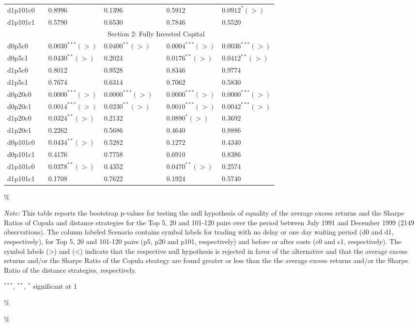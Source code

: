 \documentclass[a4paper]{article}
\begin{document}
\begin{threeparttable}[H]
\begin{tabularx}{\textwidth}{@{\extracolsep{\fill}}lllllll@{}}
			d1p101c0 & & 0.8996 & 0.1396 &       & 0.5912 & $0.0912^{*}(>)$ \\
			d1p101c1 & & 0.5790 & 0.6530 &       & 0.7846 & 0.5520 \\
			\midrule
			& \multicolumn{6}{c}{Section 2:  Fully Invested Capital } \\
			\midrule
			d0p5c0 & & $0.0030^{***}(>)$ & $0.0400^{**}(>)$ &       & $0.0004^{***}(>)$ & $0.0036^{***}(>)$ \\
			d0p5c1 & & $0.0430^{**}(>)$ & 0.2024 &       & $0.0176^{**}(>)$ & $0.0412^{**}(>)$ \\
			d1p5c0 & & 0.8012 & 0.9528 &       & 0.8346 & 0.9774 \\
			d1p5c1 & & 0.7674 & 0.6314 &       & 0.7062 & 0.5830 \\
			d0p20c0 & & $0.0000^{***}(>)$ & $0.0000^{***}(>)$ &       & $0.0000^{***}(>)$ & $0.0000^{***}(>)$ \\
			d0p20c1 & & $0.0014^{***}(>)$ & $0.0230^{**}(>)$ &       & $0.0010^{***}(>)$ & $0.0042^{***}(>)$ \\
			d1p20c0 & & $0.0324^{**}(>)$ & 0.2132 &       & $0.0890^{*}(>)$ & 0.3692 \\
			d1p20c1 & & 0.2262 & 0.5686 &       & 0.4640 & 0.8886 \\
			d0p101c0 & & $0.0434^{**}(>)$ & 0.5282 &       & 0.1272 & 0.4340 \\
			d0p101c1 & & 0.4176 & 0.7758 &       & 0.6910 & 0.8386 \\
			d1p101c0 & & $0.0378^{**}(>)$ & 0.4352 &       & $0.0470^{**}(>)$ & 0.2574 \\
			d1p101c1 & & 0.1708 & 0.7622 &       & 0.1924 & 0.5740 \\
			\bottomrule
		\end{tabularx}\%
		\begin{tablenotes}
			\item \textit{Note:} \scriptsize This table reports the bootstrap p-values for testing the null hypothesis of equality of the average excess returns and the Sharpe Ratios of Copula and distance strategies for the Top 5, 20 and 101-120 pairs over the period between July 1991 and December 1999 (2149 observations). The column labeled Scenario contains symbol labels for trading with no delay or one day waiting period (d0 and d1, respectively), for Top 5, 20 and 101-120 pairs (p5, p20 and p101, respectively) and before or after costs (c0 and c1, respectively). The symbol labels (>) and (<) indicate that the respective null hypothesis is rejected in favor of the alternative and that the average excess returns and/or the Sharpe Ratio of the Copula strategy are found greater or less than the the average excess returns and/or the Sharpe Ratio of the distance strategies, respectively.
			\item \scriptsize $^{\ast\ast\ast}$, $^{\ast\ast}$, $^{\ast}$  significant at 1\\%
		\end{tablenotes}
		\label{tab:table121}\%
	\end{threeparttable}\%
	
\end{document}
